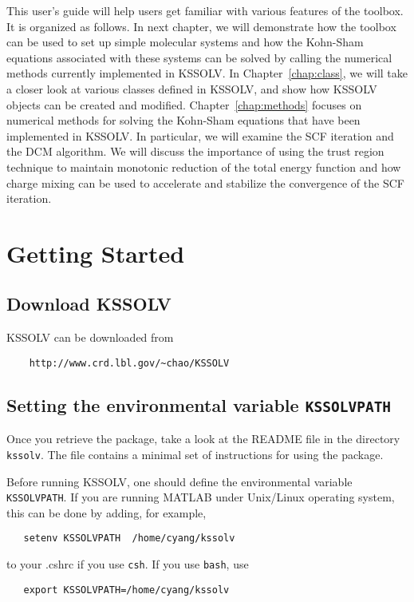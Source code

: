 \documentclass[11pt]{book}
\begin{document}
This user's guide will help users get familiar with various
features of the toolbox.  It is organized as follows. 
In next chapter, we will demonstrate how the toolbox
can be used to set up simple molecular systems and how the
Kohn-Sham equations associated with these systems can be solved
by calling the numerical methods currently implemented in KSSOLV.
In Chapter~\ref{chap:class}, we will take a closer look at
various classes defined in KSSOLV, and show how KSSOLV
objects can be created and modified.
Chapter~\ref{chap:methods} focuses on numerical methods for
solving the Kohn-Sham equations that have been  implemented 
in KSSOLV. In particular, we will examine the SCF iteration and
the DCM algorithm.  We will discuss the importance of using
the trust region technique to maintain monotonic reduction of the
total energy function and how charge mixing can be used to
accelerate and stabilize the convergence of the SCF iteration.

\chapter{Getting Started} \label{chap:start}
%
\section{Download KSSOLV}
KSSOLV can be downloaded from 
\begin{verbatim}
    http://www.crd.lbl.gov/~chao/KSSOLV
\end{verbatim}

\section{Setting the environmental variable {\tt KSSOLVPATH}}
Once you retrieve the package, take a look at the README file in the directory
{\tt kssolv}. The file contains a minimal set of instructions for 
using the package.

Before running KSSOLV, one should define the environmental variable {\tt
  KSSOLVPATH}.  If you are running MATLAB under Unix/Linux operating system, this can
  be done by adding, for example, 
\begin{verbatim}
   setenv KSSOLVPATH  /home/cyang/kssolv
\end{verbatim}
to your .cshrc if you use {\tt csh}.  If you use {\tt bash}, use
\begin{verbatim}
   export KSSOLVPATH=/home/cyang/kssolv
\end{verbatim}
\end{document}
